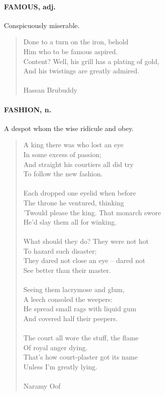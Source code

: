 \documentclass[11pt]{article}
\begin{document}
\paragraph{FAMOUS, adj.}  Conspicuously miserable.

\begin{quote}   Done to a turn on the iron, behold \\
      Him who to be famous aspired. \\
  Content?  Well, his grill has a plating of gold, \\
      And his twistings are greatly admired. \\
 \\
Hassan Brubuddy \end{quote}


\paragraph{FASHION, n.}  A despot whom the wise ridicule and obey.

\begin{quote}   A king there was who lost an eye \\
      In some excess of passion; \\
  And straight his courtiers all did try \\
      To follow the new fashion. \\
 \\
  Each dropped one eyelid when before \\
      The throne he ventured, thinking \\
  'Twould please the king.  That monarch swore \\
      He'd slay them all for winking. \\
 \\
  What should they do?  They were not hot \\
      To hazard such disaster; \\
  They dared not close an eye -- dared not \\
      See better than their master. \\
 \\
  Seeing them lacrymose and glum, \\
      A leech consoled the weepers: \\
  He spread small rags with liquid gum \\
      And covered half their peepers. \\
 \\
  The court all wore the stuff, the flame \\
      Of royal anger dying. \\
  That's how court-plaster got its name \\
      Unless I'm greatly lying. \\
 \\
Naramy Oof \end{quote}
\end{document}
